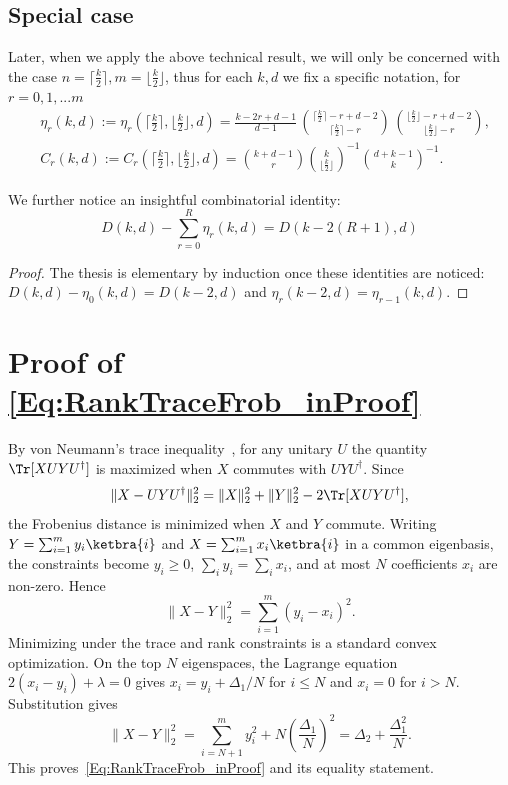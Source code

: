 \documentclass[aps,twocolumn,pra,superscriptaddress,nofootinbib]{revtex4-2}
\newcommand{\sumab}[2]{\underset{#1}{\overset{#2}{\sum}}}
\begin{document}
\subsection{Special case}

Later, when we apply the above technical result, we will only be concerned with the case $n=\lceil \frac{k}{2}\rceil,m=\lfloor \frac{k}{2}\rfloor$, thus for each $k,d$ we fix a specific notation, for $r = 0,1,...m $
 \begin{align}  %
     & \eta_{r}(k,d):= \eta_{r}(\lceil \tfrac{k}{2}\rceil,\lfloor \tfrac{k}{2}\rfloor,d) = \frac{k-2r + d - 1}{d-1}\,
  \binom{\lceil \frac{k}{2}\rceil-r + d - 2}{\lceil \frac{k}{2}\rceil-r}\,
  \binom{\lfloor \frac{k}{2}\rfloor-r + d - 2}{\lfloor \frac{k}{2}\rfloor-r}, \label{Eq:Multiplicities} \\
     & C_{r}(k,d) := C_{r}(\lceil \tfrac{k}{2}\rceil,\lfloor \tfrac{k}{2}\rfloor,d) = \binom{k+d-1}{r} \binom{k}{\lfloor \frac{k}{2}\rfloor}^{-1}\binom{d+k-1}{k}^{-1}.\label{Eq:Eigenvalues} 
 \end{align}

We further notice an insightful combinatorial identity: 
\begin{equation}\label{Eq:CombinatorialEq}
    D(k,d)-\sumab{r=0}{R}\eta_{r}(k,d)=D(k-2(R+1),d)
\end{equation}
 \begin{proof}
     The thesis is elementary by induction once these identities are noticed: $ D(k,d)-\eta_{0}(k,d)=D(k-2,d)$ and $\eta_{r}(k-2,d)=\eta_{r-1}(k,d)$.
\end{proof}   


\section{Proof of \eqref{Eq:RankTraceFrob_inProof}} \label{app:RankTraceLemma}


By von Neumann's trace inequality~\cite{NeummanTraceIneq(1937),VonNTraceIneq(1975)},
for any unitary $U$ the quantity $\Tr[XUYU^\dagger]$ is maximized when $X$ commutes with $UYU^\dagger$.
Since
\[
\|X-UYU^\dagger\|_2^2=\|X\|_2^2+\|Y\|_2^2-2\Tr[XUYU^\dagger],
\]
the Frobenius distance is minimized when $X$ and $Y$ commute. Writing $Y=\sum_{i=1}^m y_i \ketbra{i}$ and
$X=\sum_{i=1}^m x_i \ketbra{i}$ in a common eigenbasis, the constraints become
$y_i\ge0$, $\sum_i y_i=\sum_i x_i$, and at most {$N$} coefficients $x_i$ are non-zero. Hence
\[
\|X-Y\|_2^2=\sum_{i=1}^m (y_i-x_i)^2.
\]
Minimizing under the trace and rank constraints is a standard convex optimization. {On the top $N$ eigenspaces, the Lagrange equation $2(x_i-y_i)+\lambda=0$ gives $x_i=y_i+\Delta_1/N$ for $i\le N$ and $x_i=0$ for $i>N$. Substitution gives}
\[
{
\|X-Y\|_2^2
=\sum_{i=N+1}^m y_i^2+N\left(\frac{\Delta_1}{N}\right)^2
=\Delta_2+\frac{\Delta_1^2}{N}.}
\]
This proves~\eqref{Eq:RankTraceFrob_inProof} and its equality statement.
\end{document}

